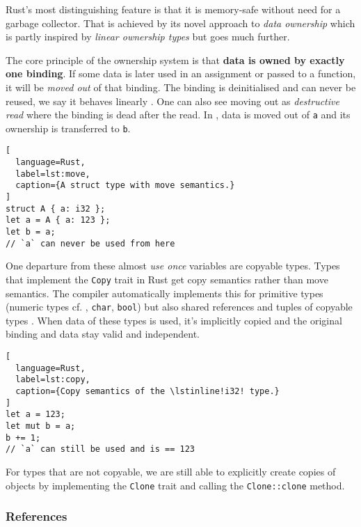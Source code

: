 Rust's most distinguishing feature is that it is memory-safe without
need for a garbage collector. That is achieved by its novel approach to
\emph{data ownership} which is partly inspired by \emph{linear ownership
types} \citep{ownership-types} but goes much further.

The core principle of the ownership system is that \textbf{data is owned
by exactly one binding}. If some data is later used in an assignment or
passed to a function, it will be \emph{moved out} of that binding. The
binding is deinitialised and can never be reused, we say it behaves
linearly \cite{oxide}. One can also see moving out as \emph{destructive
read} \cite{islands-alias-protection} where the binding is dead after the read.
In ,
data is moved out of \passthrough{\lstinline!a!} and its
ownership is transferred to \passthrough{\lstinline!b!}.

\begin{lstlisting}[
  language=Rust,
  label=lst:move,
  caption={A struct type with move semantics.}
]
struct A { a: i32 };
let a = A { a: 123 };
let b = a;
// `a` can never be used from here
\end{lstlisting}

One departure from these almost \emph{use once} \citep{use-once} variables are
copyable types. Types that implement the \passthrough{\lstinline!Copy!} trait in
Rust get copy semantics rather than move semantics. The compiler automatically
implements this for primitive types (numeric types cf. ,
\passthrough{\lstinline!char!}, \passthrough{\lstinline!bool!}) but also shared
references and tuples of copyable types \cite[section "Special
types and traits"]{rustref}. When data of these types is used, it's implicitly
copied and the original binding and data stay valid and independent.

\begin{lstlisting}[
  language=Rust,
  label=lst:copy,
  caption={Copy semantics of the \lstinline!i32! type.}
]
let a = 123;
let mut b = a;
b += 1;
// `a` can still be used and is == 123
\end{lstlisting}

For types that are not copyable, we are still able to explicitly create
copies of objects by implementing the \passthrough{\lstinline!Clone!}
trait and calling the \passthrough{\lstinline!Clone::clone!} method.

\subsubsection{References}

